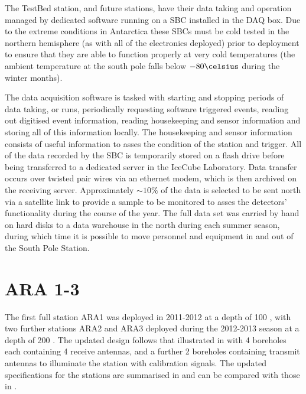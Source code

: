The TestBed station, and future stations, have their data taking and operation managed by dedicated software running on a SBC installed in the DAQ box. Due to the extreme conditions in Antarctica these SBCs must be cold tested in the northern hemisphere (as with all of the electronics deployed) prior to deployment to ensure that they are able to function properly at very cold temperatures (the ambient temperature at the south pole falls below $-80 \celsius $ during the winter months).

The data acquisition software is tasked with starting and stopping  periods of data taking, or runs, periodically requesting software triggered events, reading out digitised event information, reading housekeeping and sensor information and storing all of this information locally. The housekeeping and sensor information consists of useful information to asses the condition of the station and trigger. All of the data recorded by the SBC is temporarily stored on a flash drive before being transferred to a dedicated server in the IceCube Laboratory. Data transfer occurs over twisted pair wires via an ethernet modem, which is then archived on the receiving server. Approximately $\sim 10 \%$ of the data is selected to be sent north via a satellite link to provide a sample to be monitored to asses the detectors' functionality during the course of the year. The full data set was carried by hand on hard disks to a data warehouse in the north during each summer season, during which time it is possible to move personnel and equipment in and out of the South Pole Station. 


\section{ARA 1-3}
\label{sec:ara-detector:ARA1-3}

The first full station ARA1 was deployed in 2011-2012 at a depth of 100 \meter, with two further stations ARA2 and ARA3 deployed during the 2012-2013 season at a depth of 200 \meter. The updated design follows that illustrated in  with 4 boreholes each containing 4 receive antennas, and a further 2 boreholes containing transmit antennas to illuminate the station with calibration signals. The updated specifications for the stations are summarised in  and can be compared with those in .

